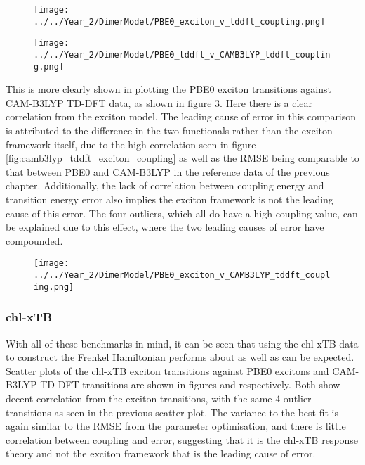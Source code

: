 \begin{figure}
    \centering
    \texttt{[image: ../../Year\_2/DimerModel/PBE0\_exciton\_v\_tddft\_coupling.png]}
    \label{fig:pbe0_exciton_tddft}
\end{figure}

\begin{figure}
    \centering
    \texttt{[image: ../../Year\_2/DimerModel/PBE0\_tddft\_v\_CAMB3LYP\_tddft\_coupling.png]}
    \label{fig:pbe0_tddft_camb3lyp_tddft}
\end{figure}

This is more clearly shown in plotting the PBE0 exciton transitions against CAM-B3LYP
TD-DFT data, as shown in figure \ref{fig:pbe0_exciton_camb3lyp_tddft}. Here there 
is a clear correlation from the exciton model. The leading cause of error in this
comparison is attributed to the difference in the two functionals rather than the
exciton framework itself, due to the high correlation seen in figure \ref{fig:camb3lyp_tddft_exciton_coupling}
as well as the RMSE being comparable to that between PBE0 and CAM-B3LYP in the reference 
data of the previous chapter. Additionally, the lack of correlation between coupling
energy and transition energy error also implies the exciton framework is not the
leading cause of this error. The four outliers, which all do have a high coupling
value, can be explained due to this effect, where the two leading causes of error
have compounded.

\begin{figure}
    \centering
    \texttt{[image: ../../Year\_2/DimerModel/PBE0\_exciton\_v\_CAMB3LYP\_tddft\_coupling.png]}
    \label{fig:pbe0_exciton_camb3lyp_tddft}
\end{figure}

\afterpartskip
\subsubsection{chl-xTB}
\label{subsubsec:chl_xtb_excitons}

With all of these benchmarks in mind, it can be seen that using the chl-xTB data
to construct the Frenkel Hamiltonian performs about as well as can be expected.
Scatter plots of the chl-xTB exciton transitions against PBE0 excitons and CAM-B3LYP
TD-DFT transitions are shown in figures \label{fig:chl_xtb_PBE0_exciton_coupling}
and \label{fig:chl_xtb_camb3lyp_tddft_coupling} respectively. Both show decent correlation
from the exciton transitions, with the same 4 outlier transitions as seen in the
previous scatter plot. The variance to the best fit is again similar to the RMSE
from the parameter optimisation, and there is little correlation between coupling
and error, suggesting that it is the chl-xTB response theory and not the exciton
framework that is the leading cause of error.


